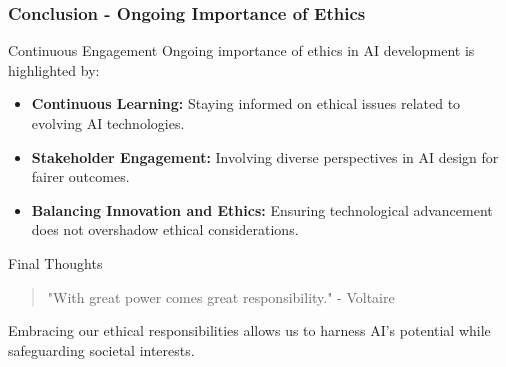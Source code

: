 \documentclass[aspectratio=169]{beamer}
\begin{document}
\begin{frame}[fragile]
    \frametitle{Conclusion - Ongoing Importance of Ethics}
    \begin{block}{Continuous Engagement}
        Ongoing importance of ethics in AI development is highlighted by:
        \begin{itemize}
            \item \textbf{Continuous Learning:} Staying informed on ethical issues related to evolving AI technologies.
            \item \textbf{Stakeholder Engagement:} Involving diverse perspectives in AI design for fairer outcomes.
            \item \textbf{Balancing Innovation and Ethics:} Ensuring technological advancement does not overshadow ethical considerations.
        \end{itemize}
    \end{block}
    
    \begin{block}{Final Thoughts}
        \begin{quote}
            "With great power comes great responsibility." - Voltaire
        \end{quote}
        Embracing our ethical responsibilities allows us to harness AI's potential while safeguarding societal interests.
    \end{block}
\end{frame}
\end{document}
